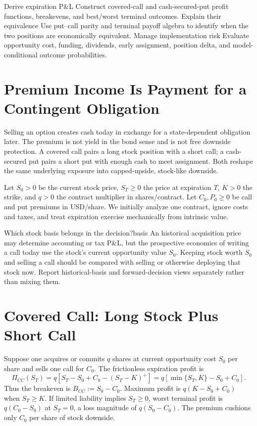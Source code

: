 \documentclass[11pt]{article}
\begin{document}

\learningobjectives
  {Derive expiration P\&L}
  {Construct covered-call and cash-secured-put profit functions, breakevens, and best/worst terminal outcomes.}
  {Explain their equivalence}
  {Use put--call parity and terminal payoff algebra to identify when the two positions are economically equivalent.}
  {Manage implementation risk}
  {Evaluate opportunity cost, funding, dividends, early assignment, position delta, and model-conditional outcome probabilities.}

\section{Premium Income Is Payment for a Contingent Obligation}

Selling an option creates cash today in exchange for a state-dependent obligation later. The premium is not yield in the bond sense and is not free downside protection. A covered call pairs a long stock position with a short call; a cash-secured put pairs a short put with enough cash to meet assignment. Both reshape the same underlying exposure into capped-upside, stock-like downside.

Let $S_0>0$ be the current stock price, $S_T\geq 0$ the price at expiration $T$, $K>0$ the strike, and $q>0$ the contract multiplier in shares/contract. Let $C_0,P_0\geq 0$ be call and put premiums in USD/share. We initially analyze one contract, ignore costs and taxes, and treat expiration exercise mechanically from intrinsic value.

\begin{remark}{Which stock basis belongs in the decision?}{basis}
An historical acquisition price may determine accounting or tax P\&L, but the prospective economics of writing a call today use the stock's current opportunity value $S_0$. Keeping stock worth $S_0$ and selling a call should be compared with selling or otherwise deploying that stock now. Report historical-basis and forward-decision views separately rather than mixing them.
\end{remark}

\section{Covered Call: Long Stock Plus Short Call}

Suppose one acquires or commits $q$ shares at current opportunity cost $S_0$ per share and sells one call for $C_0$. The frictionless expiration profit is
\begin{equation}
  \label{eq:covered-call-profit}
  \Pi_{CC}(S_T)
  =q\left[S_T-S_0+C_0-(S_T-K)^+\right]
  =q\left[\min\{S_T,K\}-S_0+C_0\right].
\end{equation}
Thus the breakeven is $B_{CC}:=S_0-C_0$. Maximum profit is $q(K-S_0+C_0)$ when $S_T\geq K$. If limited liability implies $S_T\geq 0$, worst terminal profit is $q(C_0-S_0)$ at $S_T=0$, a loss magnitude of $q(S_0-C_0)$. The premium cushions only $C_0$ per share of stock downside.
\end{document}
